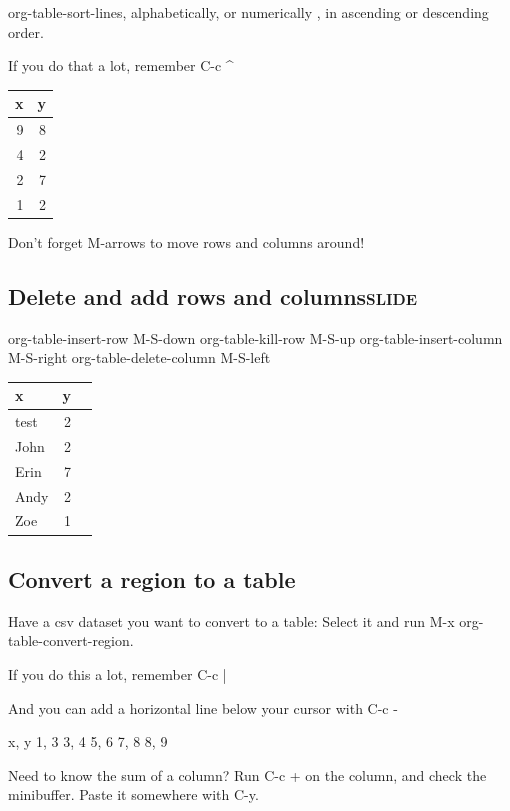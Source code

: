\documentclass[11pt]{article}
\begin{document}
org-table-sort-lines, alphabetically, or numerically , in ascending or descending order.

If you do that a lot, remember C-c \^{}

\begin{center}
\begin{tabular}{rr}
x & y\\
\hline
9 & 8\\
4 & 2\\
2 & 7\\
1 & 2\\
\end{tabular}
\end{center}

Don't forget M-arrows to move rows and columns around!

\subsection{Delete and add rows and columns\hfill{}\textsc{slide}}
\label{sec-9-4}

org-table-insert-row      M-S-down
org-table-kill-row        M-S-up
org-table-insert-column   M-S-right
org-table-delete-column   M-S-left

\begin{center}
\begin{tabular}{lrl}
x & y & \\
\hline
test & 2 & \\
John & 2 & \\
Erin & 7 & \\
Andy & 2 & \\
Zoe & 1 & \\
\end{tabular}
\end{center}

\subsection{Convert a region to a table}
\label{sec-9-5}

Have a csv dataset you want to convert to a table: Select it and run M-x org-table-convert-region.

If you do this a lot, remember C-c |

And you can add a horizontal line below your cursor with C-c -

x, y
1, 3 
3, 4
5, 6
7, 8
8, 9

Need to know the sum of a column? Run C-c + on the column, and check the minibuffer. Paste it somewhere with C-y.
\end{document}
